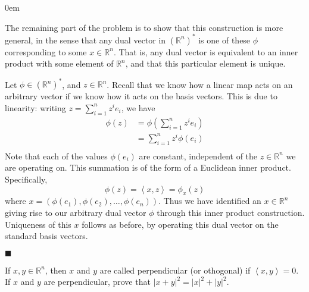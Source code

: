 \documentclass[12pt]{article}
\renewcommand{\qed}{\hfill$\blacksquare$}
\renewenvironment{proof}{\begin{addmargin}[1em]{0em}\begin{newproof}}{\end{newproof}\end{addmargin}\qed}
\newenvironment{problem}[2][Problem]{\begin{trivlist}
\item[\hskip \labelsep {\bfseries #1}\hskip \labelsep {\bfseries #2.}]}{\end{trivlist}}
\begin{document}
\begin{proof}
The remaining part of the problem is to show that this construction is more general, in the sense that any dual vector in $\left( \mathbb{R}^n\right)^*$ is one of these $\phi$ corresponding to some $x\in \mathbb{R}^n$.  That is, any dual vector is equivalent to an inner product with some element of $\mathbb{R}^n$, and that this particular element is unique.

Let $\phi \in \left(\mathbb{R}^n\right)^*$, and $z\in \mathbb{R}^n$. Recall that we know how a linear map acts on an arbitrary vector if we know how it acts on the basis vectors. This is due to linearity: writing $z = \sum_{i=1}^n z^i e_i $, we have
\begin{equation*}
\begin{split} 
\phi \left(z\right) & = \phi \left( \sum_{i=1}^n z^i e_i \right) \\
& = \sum_{i=1}^n z^i \phi \left(e_i\right) \\
\end{split}
\end{equation*}
Note that each of the values $\phi\left(e_i\right)$ are constant, independent of the $z \in \mathbb{R}^n$ we are operating on. This summation is of the form of a Euclidean inner product. Specifically,
\begin{equation*}
\phi\left(z\right) = \left\langle x, z \right\rangle = \phi_x \left(z\right)
\end{equation*}
where $x = \left( \phi\left(e_1\right), \phi\left(e_2\right), \ldots, \phi\left(e_n\right) \right)$. Thus we have identified an $x\in \mathbb{R}^n$ giving rise to our arbitrary dual vector $\phi$ through this inner product construction. Uniqueness of this $x$ follows as before, by operating this dual vector on the standard basis vectors.
\end{proof}
 
 
 
 
 
 
 \begin{problem}{1.13}
 If $x,y\in \mathbb{R}^n$, then $x$ and $y$ are called perpendicular (or othogonal) if $\left\langle x, y\right\rangle = 0$. If $x$ and $y$ are perpendicular, prove that $\left|x+y\right|^2 = \left|x\right|^2 + \left|y\right|^2$.
\end{problem} 
 
\end{document}
